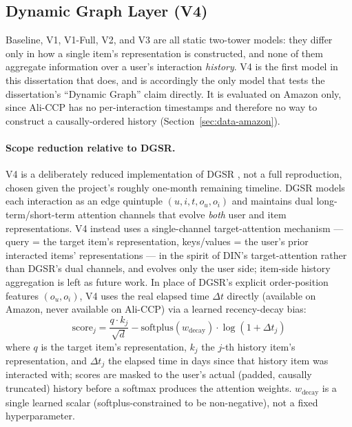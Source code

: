 \documentclass{uclthesis}
\begin{document}
\subsection{Dynamic Graph Layer (V4)}
\label{sec:v4}

Baseline, V1, V1-Full, V2, and V3 are all static two-tower models: they differ only in how a single item's representation is constructed, and none of them aggregate information over a user's interaction \emph{history}. V4 is the first model in this dissertation that does, and is accordingly the only model that tests the dissertation's ``Dynamic Graph'' claim directly. It is evaluated on Amazon only, since Ali-CCP has no per-interaction timestamps and therefore no way to construct a causally-ordered history (Section~\ref{sec:data-amazon}).

\paragraph{Scope reduction relative to DGSR.} V4 is a deliberately reduced implementation of DGSR \citep{zhang2022dgsr}, not a full reproduction, chosen given the project's roughly one-month remaining timeline. DGSR models each interaction as an edge quintuple $(u, i, t, o_u, o_i)$ and maintains dual long-term/short-term attention channels that evolve \emph{both} user and item representations. V4 instead uses a single-channel target-attention mechanism --- query = the target item's representation, keys/values = the user's prior interacted items' representations --- in the spirit of DIN's target-attention \citep{zhou2018din} rather than DGSR's dual channels, and evolves only the user side; item-side history aggregation is left as future work. In place of DGSR's explicit order-position features $(o_u, o_i)$, V4 uses the real elapsed time $\Delta t$ directly (available on Amazon, never available on Ali-CCP) via a learned recency-decay bias:
\[
\text{score}_j = \frac{q \cdot k_j}{\sqrt{d}} - \text{softplus}(w_{\text{decay}}) \cdot \log(1 + \Delta t_j)
\]
where $q$ is the target item's representation, $k_j$ the $j$-th history item's representation, and $\Delta t_j$ the elapsed time in days since that history item was interacted with; scores are masked to the user's actual (padded, causally truncated) history before a softmax produces the attention weights. $w_{\text{decay}}$ is a single learned scalar (softplus-constrained to be non-negative), not a fixed hyperparameter.
\end{document}
